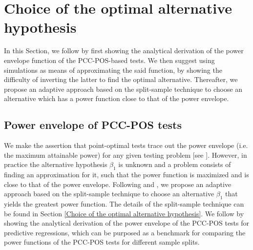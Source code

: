 \documentclass[harvard,11pt]{article}
\begin{document}
\section{Choice of the optimal alternative hypothesis \label{optimal
alternative hypothesis}}

In this Section, we follow \citet{dufour2010exact} by first showing the analytical derivation of the power envelope function of the PCC-POS-based tests. We then suggest using simulations as means of approximating the said function, by showing the difficulty of inverting the latter to find the optimal alternative. Thereafter, we propose an adaptive approach based on the split-sample technique to choose an alternative which has a power function close to that of the power envelope.

\subsection{Power envelope of PCC-POS tests \label{Power envelope of PCC-POS tests}}
We make the assertion that point-optimal tests trace out the power envelope (i.e. the maximum attainable power) for any given testing problem [see \citet{king1987towards}]. However, in practice the alternative hypothesis $\beta_1$ is unknown and a problem consists of finding an approximation for it, such that the power function is maximized and is close to that of the power envelope. Following \citet{dufour2010exact} and \citet{dufour2001finite}, we propose an adaptive approach based on the split-sample technique to choose an alternative $\beta_1$ that yields the greatest power function. The details of the split-sample technique can be found in Section \ref{Choice of the optimal alternative hypothesis}. We follow \citet{dufour2010exact} by showing the analytical derivation of the power envelope of the PCC-POS tests for predictive regressions, which can be purposed as a benchmark for comparing the power functions of the PCC-POS tests for different sample splits. 
\end{document}
